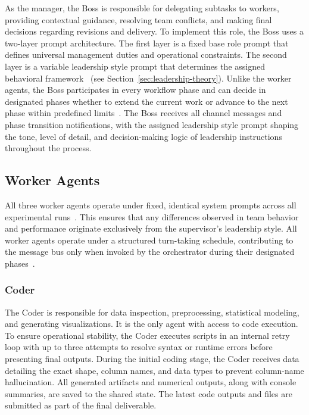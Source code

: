 As the manager, the Boss is responsible for delegating subtasks to workers, providing contextual guidance, resolving team conflicts, and making final decisions regarding revisions and delivery.
To implement this role, the Boss uses a two-layer prompt architecture.
The first layer is a fixed base role prompt that defines universal management duties and operational constraints.
The second layer is a variable leadership style prompt that determines the assigned behavioral framework~\cite{goleman2000leadership, serapiogarcia2025personalitytraitslargelanguage} (see Section~\ref{sec:leadership-theory}).
Unlike the worker agents, the Boss participates in every workflow phase and can decide in designated phases whether to extend the current work or advance to the next phase within predefined limits~\cite{wang2025talkstructurallyacthierarchically}.
The Boss receives all channel messages and phase transition notifications, with the assigned leadership style prompt shaping the tone, level of detail, and decision-making logic of leadership instructions throughout the process.

\subsection{Worker Agents}
\label{subsec:worker-agents}

All three worker agents operate under fixed, identical system prompts across all experimental runs~\cite{kwak2026leadershipcoordinationcontrolbehavioral}.
This ensures that any differences observed in team behavior and performance originate exclusively from the supervisor's leadership style. 
All worker agents operate under a structured turn-taking schedule, contributing to the message bus only when invoked by the orchestrator during their designated phases~\cite{dang2025multiagentcollaborationevolvingorchestration}.

\subsubsection{Coder}
\label{subsubsec:coder}

The Coder is responsible for data inspection, preprocessing, statistical modeling, and generating visualizations.
It is the only agent with access to code execution. 
To ensure operational stability, the Coder executes scripts in an internal retry loop with up to three attempts to resolve syntax or runtime errors before presenting final outputs.
During the initial coding stage, the Coder receives data detailing the exact shape, column names, and data types to prevent column-name hallucination.
All generated artifacts and numerical outputs, along with console summaries, are saved to the shared state.
The latest code outputs and files are submitted as part of the final deliverable.

